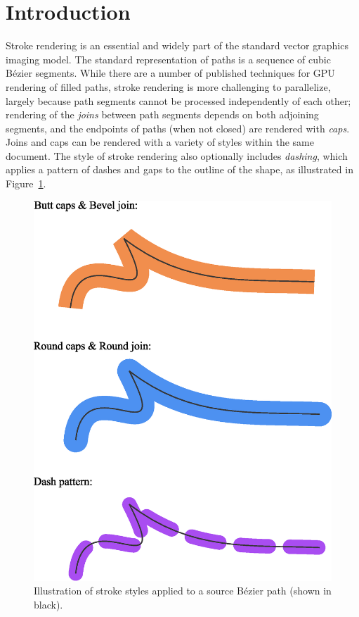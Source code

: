 \documentclass[sigconf, nonacm]{acmart}
\begin{document}
\maketitle
\thispagestyle{empty}
\pagestyle{plain}

\section{Introduction}

Stroke rendering is an essential and widely part of the standard vector graphics imaging model. The standard representation of paths is a sequence of cubic Bézier segments. While there are a number of published techniques for GPU rendering of filled paths, stroke rendering is more challenging to parallelize, largely because path segments cannot be processed independently of each other; rendering of the \emph{joins} between path segments depends on both adjoining segments, and the endpoints of paths (when not closed) are rendered with \emph{caps}. Joins and caps can be rendered with a variety of styles within the same document. The style of stroke rendering also optionally includes \emph{dashing}, which applies a pattern of dashes and gaps to the outline of the shape, as illustrated in Figure~\ref{fig:stroke_styles}.

\begin{figure}
    \vspace{15pt}
    \includegraphics[scale=0.4]{stroke_styles}
    \caption{Illustration of stroke styles applied to a source Bézier path (shown in black).}
    \label{fig:stroke_styles}
\end{figure}
\end{document}
